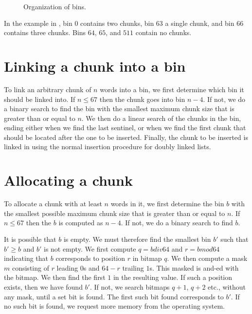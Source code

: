 \begin{figure}
\begin{center}
\end{center}
\caption{\label{fig-bins}
Organization of bins.}
\end{figure}

In the example in , bin $0$ contains two chunks, bin
$63$ a single chunk, and bin $66$ contains three chunks.  Bins $64$,
$65$, and $511$ contain no chunks.

\section{Linking a chunk into a bin}

To link an arbitrary chunk of $n$ words into a bin, we first determine
which bin it should be linked into.  If $n \le 67$ then the chunk goes
into bin $n-4$.  If not, we do a binary search to find the bin with
the smallest maximum chunk size that is greater than or equal to $n$.
We then do a linear search of the chunks in the bin, ending either
when we find the last sentinel, or when we find the first chunk that
should be located after the one to be inserted.  Finally, the chunk to
be inserted is linked in using the normal insertion procedure for
doubly linked lists.

\section{Allocating a chunk}

To allocate a chunk with at least $n$ words in it, we first determine
the bin $b$ with the smallest possible maximum chunk size that is
greater than or equal to $n$.  If $n \le 67$ then the $b$ is computed
as $n-4$.  If not, we do a binary search to find $b$.

It is possible that $b$ is empty.  We must therefore find the smallest
bin $b'$ such that $b' \ge b$ and $b'$ is not empty.  We first compute
$q = b div 64$ and $r = b mod 64$ indicating that $b$ corresponds to
position $r$ in bitmap $q$.  We then compute a mask $m$ consisting of
$r$ leading $0$s and $64-r$ trailing $1$s.  This masked is and-ed with
the bitmap.  We then find the first $1$ in the resulting value.  If
such a position exists, then we have found $b'$.  If not, we search
bitmaps $q+1$, $q+2$ etc., without any mask, until a set bit is
found.  The first such bit found corresponds to $b'$.  If no such bit
is found, we request more memory from the operating system.

